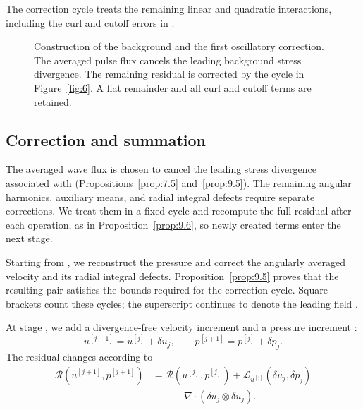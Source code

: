 %
The correction cycle treats the remaining linear and quadratic interactions, including the
curl and cutoff errors in .

\begin{figure}[htbp]
  \centering
  \caption{Construction of the background and the first oscillatory correction.
  The averaged pulse flux cancels the leading background stress divergence.
  The remaining residual is corrected by the cycle in Figure~\ref{fig:6}. A flat remainder
  and all curl and cutoff terms are retained.}
  \label{fig:5}
\end{figure}

\subsection{Correction and summation}\label{sec:3.4}
The averaged wave flux is chosen to cancel the leading stress divergence associated with
 (Propositions~\ref{prop:7.5} and~\ref{prop:9.5}). The remaining angular
harmonics, auxiliary means, and radial integral defects require separate corrections. We
treat them in a fixed cycle and recompute the full residual after each operation, as in
Proposition~\ref{prop:9.6}, so newly created terms enter the next stage.

Starting from , we reconstruct the pressure and correct the angularly
averaged velocity and its radial integral defects. Proposition~\ref{prop:9.5} proves that the resulting
pair  satisfies the bounds required for the correction cycle. Square brackets count
these cycles; the superscript  continues to denote the leading field
.

At stage , we add a divergence-free velocity increment
 and a pressure increment :
\[
u^{[j+1]}=u^{[j]}+\delta u_j,
\qquad
p^{[j+1]}=p^{[j]}+\delta p_j.
\]
The residual changes according to
\[
\begin{aligned}
\mathscr R(u^{[j+1]},p^{[j+1]})
  &=\mathscr R(u^{[j]},p^{[j]})+\mathcal L_{u^{[j]}}(\delta u_j,\delta p_j)\\
  &\qquad{}+\nabla\mathbin{\cdot}(\delta u_j\otimes\delta u_j).
\end{aligned}
\]


